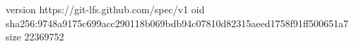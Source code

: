 version https://git-lfs.github.com/spec/v1
oid sha256:9748a9175c699acc290118b069bdb94c07810d82315aeed1758f91ff500651a7
size 22369752
